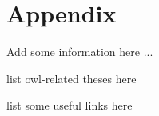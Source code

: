 \part{Appendix}

Add some information here ...



list owl-related theses here



list some useful links here